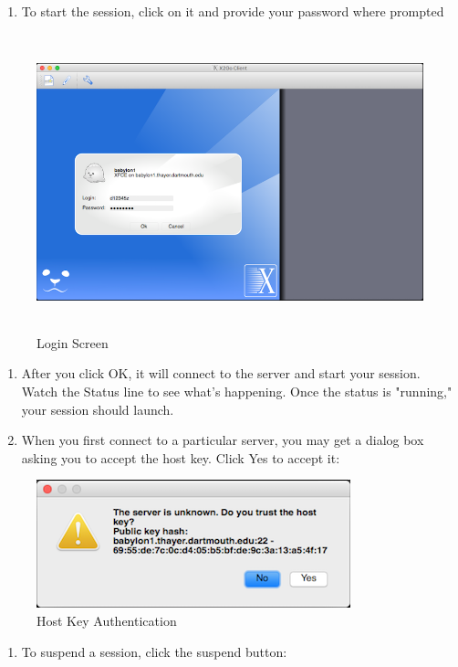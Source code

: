 \begin{enumerate}
	\def\labelenumi{\arabic{enumi}.}
	\setcounter{enumi}{9}
	\item
	To start the session, click on it and provide your password where
	prompted
\end{enumerate}
\begin{figure}
	\centering
	\includegraphics[width=5.50787in,height=3.38189in]{src/images/image6.png}
	\caption{Login Screen}
	\label{fig:fig6}
\end{figure}
\begin{enumerate}
	\def\labelenumi{\arabic{enumi}.}
	\setcounter{enumi}{10}
	\item
	After you click OK, it will connect to the server and start your
	session. Watch the Status line to see what's happening. Once the
	status is "running," your session should launch.
	\item
	When you first connect to a particular server, you may get a dialog
	box asking you to accept the host key. Click Yes to accept it:
\end{enumerate}
\begin{figure}
	\centering
	\includegraphics[width=3.58289in,height=1.45815in]{src/images/image7.png}
	\caption{Host Key Authentication}
	\label{fig:fig6}
\end{figure}
\begin{enumerate}
	\def\labelenumi{\arabic{enumi}.}
	\setcounter{enumi}{12}
	\item
	To suspend a session, click the suspend button:
\end{enumerate}
